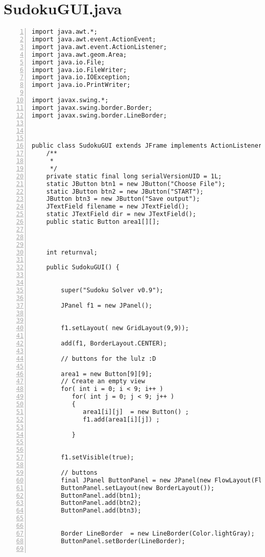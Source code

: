 \documentclass{article}
\begin{document}
\section{SudokuGUI.java}\label{sec:triangle}
\begin{lstlisting}[language=Tex,
basicstyle=\footnotesize\ttfamily,
numbers=left,stepnumber=1, 
morekeywords={assert},
tabsize=4,
breaklines=true]
import java.awt.*;
import java.awt.event.ActionEvent;
import java.awt.event.ActionListener;
import java.awt.geom.Area;
import java.io.File;
import java.io.FileWriter;
import java.io.IOException;
import java.io.PrintWriter;

import javax.swing.*;
import javax.swing.border.Border;
import javax.swing.border.LineBorder;


	
public class SudokuGUI extends JFrame implements ActionListener {
	/**
	 * 
	 */
	private static final long serialVersionUID = 1L;
	static JButton btn1 = new JButton("Choose File");
	static JButton btn2 = new JButton("START");
	JButton btn3 = new JButton("Save output");
	JTextField filename = new JTextField();
	static JTextField dir = new JTextField();
	public static Button area1[][];

	
	
	int returnval;		
	
    public SudokuGUI() {
		
		
		super("Sudoku Solver v0.9");
	
		JPanel f1 = new JPanel();
	
		
        f1.setLayout( new GridLayout(9,9));
   
        add(f1, BorderLayout.CENTER);
       
        // buttons for the lulz :D
        
        area1 = new Button[9][9];
        // Create an empty view
        for( int i = 0; i < 9; i++ )
           for( int j = 0; j < 9; j++ )
           {
        	  area1[i][j]  = new Button() ;
        	  f1.add(area1[i][j]) ;
              
           }
         
        
        f1.setVisible(true);
			
	    // buttons
        final JPanel ButtonPanel = new JPanel(new FlowLayout(FlowLayout.CENTER));
        ButtonPanel.setLayout(new BorderLayout());
        ButtonPanel.add(btn1);
        ButtonPanel.add(btn2);
        ButtonPanel.add(btn3);
       
         
        Border LineBorder  = new LineBorder(Color.lightGray);
        ButtonPanel.setBorder(LineBorder);
        

\end{lstlisting}
\end{document}
